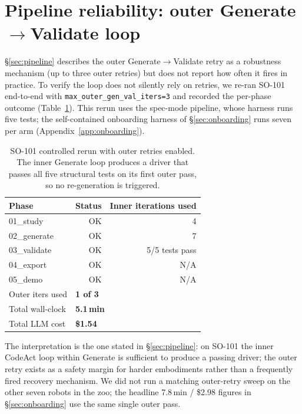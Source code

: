 \section{Pipeline reliability: outer Generate$\rightarrow$Validate loop}
\label{app:reliability}

\S\ref{sec:pipeline} describes the outer
Generate$\rightarrow$Validate retry as a robustness mechanism
(up to three outer retries) but does not report how often it
fires in practice. To verify the loop does not silently rely on
retries, we re-ran SO-101 end-to-end with
\texttt{max\_outer\_gen\_val\_iters=3} and recorded the
per-phase outcome (Table~\ref{tab:reliability}). This rerun uses the spec-mode pipeline, whose
harness runs five tests; the self-contained onboarding harness
of \S\ref{sec:onboarding} runs seven per arm (Appendix~\ref{app:onboarding}).

\begin{table}[H]
\centering
\small
\begin{tabular}{lrr}
\toprule
\textbf{Phase} & \textbf{Status} & \textbf{Inner iterations used} \\
\midrule
01\_study     & OK & 4   \\
02\_generate  & OK & 7   \\
03\_validate  & OK & 5/5 tests pass \\
04\_export    & OK & N/A \\
05\_demo      & OK & N/A \\
\midrule
Outer iters used & \multicolumn{2}{l}{\textbf{1 of 3}} \\
Total wall-clock  & \multicolumn{2}{l}{\textbf{5.1\,min}} \\
Total LLM cost    & \multicolumn{2}{l}{\textbf{\$1.54}} \\
\bottomrule
\end{tabular}
\caption{SO-101 controlled rerun with outer retries enabled. The
inner Generate loop produces a driver that passes all five
structural tests on its first outer pass, so no
re-generation is triggered.}
\label{tab:reliability}
\end{table}

The interpretation is the one stated in \S\ref{sec:pipeline}: on
SO-101 the inner CodeAct loop within Generate is sufficient to
produce a passing driver; the outer retry exists as a safety
margin for harder embodiments rather than a frequently fired
recovery mechanism. We did not run a matching outer-retry sweep
on the other seven robots in the zoo; the headline 7.8\,min /
\$2.98 figures in \S\ref{sec:onboarding} use the same single
outer pass.

